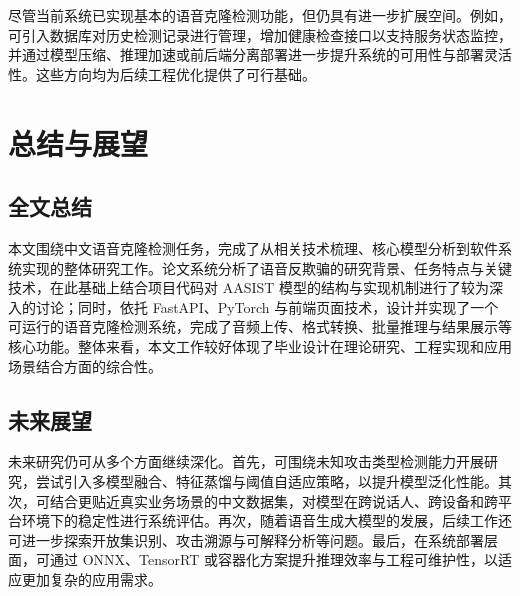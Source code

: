 \documentclass{xduugthesis}
\begin{document}
尽管当前系统已实现基本的语音克隆检测功能，但仍具有进一步扩展空间。例如，可引入数据库对历史检测记录进行管理，增加健康检查接口以支持服务状态监控，并通过模型压缩、推理加速或前后端分离部署进一步提升系统的可用性与部署灵活性。这些方向均为后续工程优化提供了可行基础。

\chapter{总结与展望}

\section{全文总结}

本文围绕中文语音克隆检测任务，完成了从相关技术梳理、核心模型分析到软件系统实现的整体研究工作。论文系统分析了语音反欺骗的研究背景、任务特点与关键技术，在此基础上结合项目代码对 AASIST 模型的结构与实现机制进行了较为深入的讨论；同时，依托 FastAPI、PyTorch 与前端页面技术，设计并实现了一个可运行的语音克隆检测系统，完成了音频上传、格式转换、批量推理与结果展示等核心功能。整体来看，本文工作较好体现了毕业设计在理论研究、工程实现和应用场景结合方面的综合性。

\section{未来展望}

未来研究仍可从多个方面继续深化。首先，可围绕未知攻击类型检测能力开展研究，尝试引入多模型融合、特征蒸馏与阈值自适应策略，以提升模型泛化性能。其次，可结合更贴近真实业务场景的中文数据集，对模型在跨说话人、跨设备和跨平台环境下的稳定性进行系统评估。再次，随着语音生成大模型的发展，后续工作还可进一步探索开放集识别、攻击溯源与可解释分析等问题。最后，在系统部署层面，可通过 ONNX、TensorRT 或容器化方案提升推理效率与工程可维护性，以适应更加复杂的应用需求。

\nocite{*}
\end{document}
